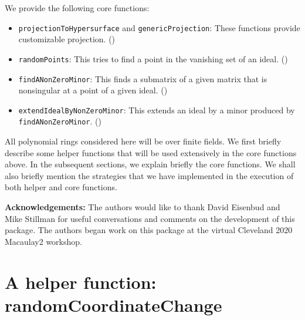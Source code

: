 \documentclass[11pt]{amsart}
\theoremstyle{definition}
\begin{document}
 We provide the following core functions:
 \begin{itemize}
		\item {\tt projectionToHypersurface} and {\tt genericProjection}: These functions provide customizable projection. () 	
 	\item {\tt randomPoints}:  This tries to find a point in the vanishing set of an ideal. ()
    \item {\tt findANonZeroMinor}:  This finds a submatrix of a given matrix that is nonsingular at a point of a given ideal. ()          
	\item {\tt extendIdealByNonZeroMinor}:  This extends an ideal by a minor produced by \\{\tt findANonZeroMinor}. ()	
 \end{itemize}
 
All polynomial rings considered here will be over finite fields. We first briefly describe some helper functions that will be used extensively in the core functions above. In the subsequent sections, we explain briefly the core functions. We shall also briefly mention the strategies that we have implemented in the execution of both helper and core functions.

\vspace{1em}
\noindent \textbf{Acknowledgements:} The authors would like to thank David Eisenbud and Mike Stillman for useful conversations and comments on the development of this package.  The authors began work on this package at the virtual Cleveland 2020 Macaulay2 workshop.

\section{A helper function: randomCoordinateChange}{\label{helper}}




\end{document}
